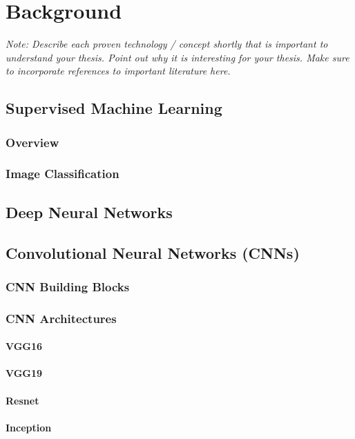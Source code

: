\documentclass[a4paper,12pt,twoside]{report}
\begin{document}
\chapter{Background}

\textit{Note: Describe each proven technology / concept shortly that is important to understand your thesis. Point out why it is interesting for your thesis. Make sure to incorporate references to important literature here.}

\section{Supervised Machine Learning}
\subsection{Overview}
\subsection{Image Classification}

\section{Deep Neural Networks}

\section{Convolutional Neural Networks (CNNs)}
\subsection{CNN Building Blocks}
\subsection{CNN Architectures}
\subsubsection{VGG16}
\subsubsection{VGG19}
\subsubsection{Resnet}
\subsubsection{Inception}
\end{document}
